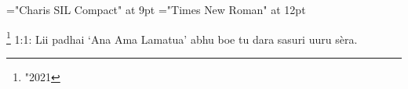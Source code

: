 \font\footnotescriptureText="Charis SIL Compact" at 9pt
\font\scriptureText="Times New Roman" at 12pt

  \footnote {\char "2021} {1:1: Lii padhai ‘Ana Ama Lamatua’ abhu boe tu dara sasuri uuru
                  sèra.}

\bye
